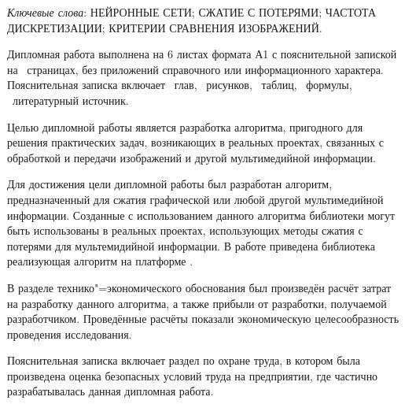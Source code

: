\thispagestyle{empty}

\emph{Ключевые слова}: НЕЙРОННЫЕ СЕТИ; СЖАТИЕ С ПОТЕРЯМИ; ЧАСТОТА ДИСКРЕТИЗАЦИИ; КРИТЕРИИ СРАВНЕНИЯ ИЗОБРАЖЕНИЙ.

\vspace{4\parsep}

Дипломная работа выполнена на 6 листах формата А1 с пояснительной запиской на~\pageref*{LastPage} страницах, без приложений справочного или информационного характера.
Пояснительная записка включает ~глав, \totfig{}~рисунков, \tottab{}~таблиц, \toteq{}~формулы, \totref{}~литературный источник.

Целью дипломной работы является разработка алгоритма, пригодного для решения практических задач, возникающих в реальных проектах, связанных с обработкой и передачи изображений и другой мультимедийной информации.

Для достижения цели дипломной работы был разработан алгоритм, предназначенный для сжатия графической или любой другой мультимедийной информации.
Созданные с использованием данного алгоритма библиотеки могут быть использованы в реальных проектах, использующих методы сжатия с потерями для мультемидийной информации.
В работе приведена библиотека реализующая алгоритм на платформе \dotnet{}.

В разделе технико"=экономического обоснования был произведён расчёт затрат на разработку данного алгоритма, а также прибыли от разработки, получаемой разработчиком.
Проведённые расчёты показали экономическую целесообразность проведения исследования.

Пояснительная записка включает раздел по охране труда, в котором была произведена оценка безопасных условий труда на предприятии, где частично разрабатывалась данная дипломная работа.

\clearpage
